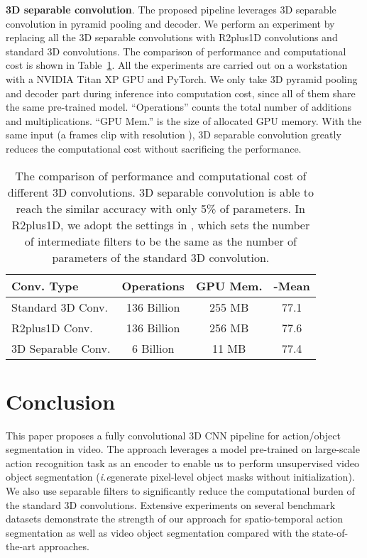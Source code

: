 \documentclass{bmvc2k}
\def\ie{\emph{i.e}\bmvaOneDot}
\begin{document}
\textbf{3D separable convolution}. The proposed pipeline leverages 3D separable convolution in pyramid pooling and decoder. We perform an experiment by replacing all the 3D separable convolutions with R2plus1D convolutions and standard 3D convolutions.
The comparison of performance and computational cost is shown in Table~\ref{tab:var_convs}. All the experiments are carried out on a workstation with a NVIDIA Titan XP GPU and PyTorch. We only take 3D pyramid pooling and decoder part during inference into computation cost, since all of them share the same pre-trained model. ``Operations'' counts the total number of additions and multiplications. ``GPU Mem.'' is the size of allocated GPU memory. With the same input (a  frames clip with resolution ), 3D separable convolution greatly reduces the computational cost without sacrificing the performance.


\begin{table}[!htbp]
\centering
\begin{tabular}{l|ccc}
\hline
Conv. Type          & Operations    & GPU Mem.  & -Mean \\
\hline
Standard 3D Conv.   & 136 Billion   & 255 MB    & 77.1\\
R2plus1D Conv.      & 136 Billion   & 256 MB    & 77.6\\
3D Separable Conv.  & 6 Billion     & 11 MB     & 77.4\\
\hline
\end{tabular}
\caption{The comparison of performance and computational cost of different 3D convolutions. 3D separable convolution is able to reach the similar accuracy with only 5\% of parameters. In R2plus1D, we adopt the settings in \cite{r2plus1d_cvpr18}, which sets the number of intermediate filters to be  the same as the number of parameters of the standard 3D convolution.} \label{tab:var_convs}
\end{table}


\section{Conclusion}
\label{sec:conclusion}
This paper proposes a fully convolutional 3D CNN pipeline for action/object segmentation in video. The approach leverages a model pre-trained on large-scale action recognition task as an encoder to enable us to perform unsupervised video object segmentation (\ie generate pixel-level object masks without initialization). We also use separable filters to significantly reduce the computational burden of the standard 3D convolutions. Extensive experiments on several benchmark datasets demonstrate the strength of our approach for spatio-temporal action segmentation as well as video object segmentation compared with the state-of-the-art approaches.
\end{document}
